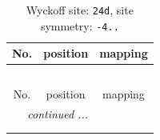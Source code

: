 \documentclass[fleqn,8pt]{jsarticle}
\begin{document}
\renewcommand{\arraystretch}{1.2}
\begin{longtable}{ccc}
\caption{Wyckoff site: {\tt 24d}, site symmetry: {\tt -4..}}
 \\
 \hline \hline
No. & position & mapping \\ \hline \endfirsthead

\multicolumn{2}{l}{\tablename\ \thetable{}} \\
 \hline \hline
No. & position & mapping \\ \hline \endhead

 \hline \hline
\multicolumn{2}{r}{\footnotesize\it continued ...} \\ \endfoot

 \hline \hline
\multicolumn{2}{r}{} \\ \endlastfoot


\end{longtable}
\end{document}
